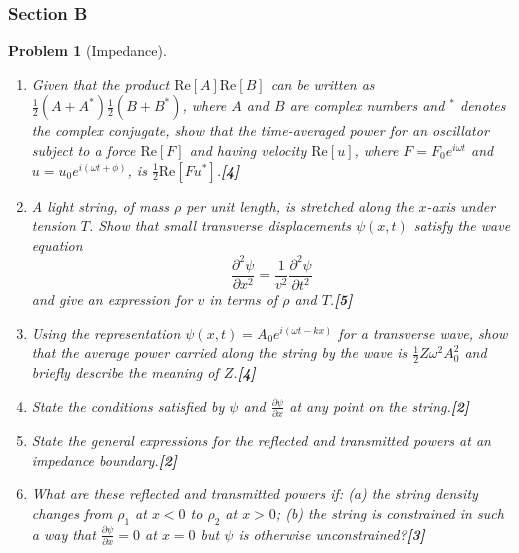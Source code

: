 \documentclass[a4paper]{article}
\theoremstyle{new}
\newtheorem{qns}{Problem}[subsection]
\begin{document}
\subsubsection{Section B}
\begin{qns}[Impedance]\leavevmode
\begin{enumerate}[label=(\roman*)]
\item Given that the product $\text{Re}[A]\text{Re}[B]$ can be written as $\frac{1}{2}(A+A^*)\frac{1}{2}(B+B^*)$, where $A$ and $B$ are complex numbers and $^*$ denotes the complex conjugate, show that the time-averaged power for an oscillator subject to a force $\text{Re}[F]$ and having velocity $\text{Re}[u]$, where $F = F_0e^{i\omega t}$ and $u = u_0e^{i(\omega t+\phi)}$, is $\frac{1}{2}\text{Re}[Fu^*]$.\hfill\textbf{[4]}
\item A light string, of mass $\rho$ per unit length, is stretched along the $x$-axis under tension $T$. Show that small transverse displacements $\psi(x,t)$ satisfy the wave equation
$$\frac{\partial^2\psi}{\partial x^2}=\frac{1}{v^2}\frac{\partial^2\psi}{\partial t^2}$$
and give an expression for $v$ in terms of $\rho$ and $T$.\hfill\textbf{[5]}
\item Using the representation $\psi(x,t)=A_0e^{i(\omega t-kx)}$ for a transverse wave, show that the average power carried along the string by the wave is $\frac{1}{2}Z\omega^2A_0^2$ and briefly describe the meaning of $Z$.\hfill\textbf{[4]}
\item State the conditions satisfied by $\psi$ and $\frac{\partial\psi}{\partial x}$ at any point on the string.\hfill\textbf{[2]}
\item State the general expressions for the reflected and transmitted powers at an impedance boundary.\hfill\textbf{[2]}
\item What are these reflected and transmitted powers if: (a) the string density changes from $\rho_1$ at $x < 0$ to $\rho_2$ at $x > 0$; (b) the string is constrained in such a way that $\frac{\partial\psi}{\partial x}=0$ at $x = 0$ but $\psi$ is otherwise unconstrained?\hfill\textbf{[3]}
\end{enumerate}
\end{qns}
\end{document}
